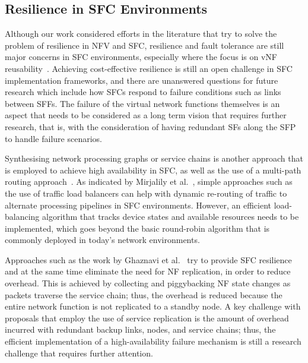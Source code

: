 \documentclass[futureinternet,review,accept,pdftex,moreauthors]{Definitions/mdpi}
\begin{document}
\subsection{Resilience in SFC Environments}
\label{Resilience in SFC environments}

Although our work considered efforts in the literature that try to solve the problem of resilience in NFV and SFC, resilience and fault tolerance are still major concerns in SFC environments, especially where the focus is on vNF reusability~\cite{chowdhury2019re}. Achieving cost-effective resilience is still an open challenge in SFC implementation frameworks, and there are unanswered questions for future research which include how SFCs respond to failure conditions such as links between SFFs. The failure of the virtual network functions themselves is an aspect that needs to be considered as a long term vision that requires further research, that is, with the consideration of having redundant SFs along the SFP to handle failure scenarios.

Synthesising network processing graphs or service chains is another approach that is employed to achieve high availability in SFC, as well as the use of a multi-path routing approach~\cite{cai2021disaster}. As indicated by Mirjalily {et al.}~\cite{mirjalily2018optimal}, simple approaches such as the use of traffic load balancers can help with dynamic re-routing of traffic to alternate processing pipelines in SFC environments. However, an efficient load-balancing algorithm that tracks device states and available resources needs to be implemented, which goes beyond the basic round-robin algorithm that is commonly deployed in today's network environments.

Approaches such as the work by Ghaznavi {et al.}~\cite{ghaznavi2020fault} try to provide SFC resilience and at the same time eliminate the need for NF replication, in order to reduce overhead. This is achieved by collecting and piggybacking NF state changes as packets traverse the service chain; thus, the overhead is reduced because the entire network function is not replicated to a standby node. A key challenge with proposals that employ the use of service replication is the amount of overhead incurred with redundant backup links, nodes, and service chains; thus, the efficient implementation of a high-availability failure mechanism is still a research challenge that requires further attention.  


\end{document}
